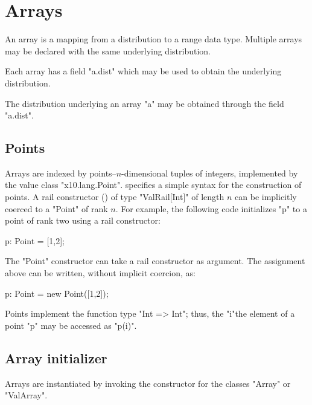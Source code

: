 \chapter{Arrays}\label{XtenArrays}

An array is a mapping from a distribution to a range data
type. Multiple arrays may be declared with the same underlying
distribution. 

Each array has a field \xcd"a.dist" which may be used to
obtain the underlying
distribution.

The distribution underlying an array \xcd"a" may be obtained through
the field \xcd"a.dist".

\section{Points}\label{point-syntax}

Arrays are indexed by points--$n$-dimensional tuples of
integers, implemented by the value class \xcd"x10.lang.Point".
\Xten{} specifies a simple syntax for the construction of points.
A rail constructor () of type \xcd"ValRail[Int]"
of length $n$
can be implicitly coerced to a \xcd"Point" of rank $n$.  For
example, the following code initializes \xcd"p" to a point of
rank two using a rail constructor:

\begin{xten}
p: Point = [1,2];
\end{xten}

The \xcd"Point" constructor can take a rail constructor as
argument.  The assignment above can be written, without
implicit coercion, as:

\begin{xten}
p: Point = new Point([1,2]);
\end{xten}

Points implement the function type \xcd"Int => Int"; thus, the
\xcd"i"the element of a point \xcd"p" may be accessed as \xcd"p(i)".



\section{Array initializer}\label{ArrayInitializer}\label{array!creation}

Arrays are instantiated by invoking the constructor for the
classes
\xcd"Array" or \xcd"ValArray".

